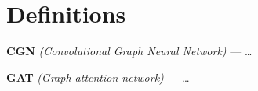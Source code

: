 \section{Definitions}

\textbf{CGN} \textit{(Convolutional Graph Neural Network)} --- \dots

\textbf{GAT} \textit{(Graph attention network)} --- \dots